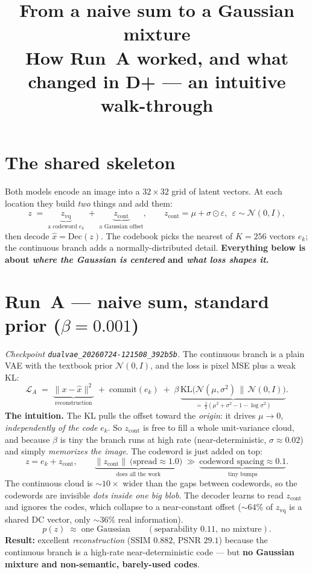 \documentclass[11pt]{article}
\title{\textbf{From a naive sum to a Gaussian mixture}\\[2pt]
\large How Run~A worked, and what changed in D+ --- an intuitive walk-through}
\date{}
\newcommand{\code}[1]{\texttt{#1}}
\begin{document}
\maketitle
\vspace{-2.4em}

\section*{The shared skeleton}
Both models encode an image into a $32{\times}32$ grid of latent vectors. At each location they build
\emph{two} things and add them:
\[
z \;=\; \underbrace{z_{\text{vq}}}_{\text{a codeword } e_k}\;+\;\underbrace{z_{\text{cont}}}_{\text{a Gaussian offset}},\qquad z_{\text{cont}}=\mu+\sigma\odot\varepsilon,\ \ \varepsilon\sim\mathcal N(0,I),
\]
then decode $\hat x=\text{Dec}(z)$. The codebook picks the nearest of $K{=}256$ vectors $e_k$; the
continuous branch adds a normally-distributed detail. \textbf{Everything below is about \emph{where the
Gaussian is centered} and \emph{what loss shapes it}.}

\section*{Run~A --- naive sum, standard prior ($\beta{=}0.001$)}
\emph{Checkpoint \code{dualvae\_20260724-121508\_392b5b}.} The continuous branch is a plain VAE with the
textbook prior $\mathcal N(0,I)$, and the loss is pixel MSE plus a weak KL:
\[
\mathcal L_A \;=\; \underbrace{\lVert x-\hat x\rVert^2}_{\text{reconstruction}}\;+\;\text{commit}(e_k)\;+\;\beta\,\underbrace{\mathrm{KL}\!\big(\mathcal N(\mu,\sigma^2)\,\big\|\,\mathcal N(0,I)\big)}_{=\ \frac12(\mu^2+\sigma^2-1-\log\sigma^2)} .
\]
\textbf{The intuition.} The KL pulls the offset toward the \emph{origin}: it drives $\mu\to 0$,
\emph{independently of the code} $e_k$. So $z_{\text{cont}}$ is free to fill a whole
unit-variance cloud, and because $\beta$ is tiny the branch runs at high rate (near-deterministic,
$\sigma\approx0.02$) and simply \emph{memorizes the image}. The codeword is just added on top:
\[
z=e_k+z_{\text{cont}},\qquad \underbrace{\lVert z_{\text{cont}}\rVert\ \text{(spread}\approx1.0)}_{\text{does all the work}}\ \gg\ \underbrace{\text{codeword spacing}\approx0.1}_{\text{tiny bumps}} .
\]
The continuous cloud is $\sim$$10\times$ wider than the gaps between codewords, so the codewords are
invisible \emph{dots inside one big blob}. The decoder learns to read $z_{\text{cont}}$ and ignores the
codes, which collapse to a near-constant offset ($\sim$$64\%$ of $z_{\text{vq}}$ is a shared DC vector,
only $\sim$$36\%$ real information).
\[
p(z)\;\approx\;\text{one Gaussian}\qquad(\text{separability }0.11,\ \text{no mixture}).
\]
\textbf{Result:} excellent \emph{reconstruction} (SSIM $0.882$, PSNR $29.1$) because the continuous
branch is a high-rate near-deterministic code --- but \textbf{no Gaussian mixture and non-semantic,
barely-used codes}.
\end{document}
